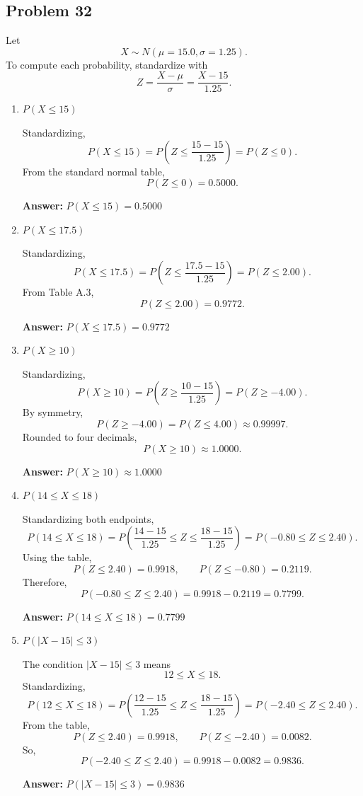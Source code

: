 \subsection*{Problem 32}

Let
\[
X \sim N(\mu=15.0,\sigma=1.25).
\]
To compute each probability, standardize with
\[
Z=\frac{X-\mu}{\sigma}=\frac{X-15}{1.25}.
\]

\begin{enumerate}
    \item[(a)] \textbf{$P(X\le 15)$}

    Standardizing,
    \[
    P(X\le 15)=P\left(Z\le \frac{15-15}{1.25}\right)=P(Z\le 0).
    \]
    From the standard normal table,
    \[
    P(Z\le 0)=0.5000.
    \]

    \textbf{Answer:} $P(X\le 15)=0.5000$

    \item[(b)] \textbf{$P(X\le 17.5)$}

    Standardizing,
    \[
    P(X\le 17.5)=P\left(Z\le \frac{17.5-15}{1.25}\right)=P(Z\le 2.00).
    \]
    From Table A.3,
    \[
    P(Z\le 2.00)=0.9772.
    \]

    \textbf{Answer:} $P(X\le 17.5)=0.9772$

    \item[(c)] \textbf{$P(X\ge 10)$}

    Standardizing,
    \[
    P(X\ge 10)=P\left(Z\ge \frac{10-15}{1.25}\right)=P(Z\ge -4.00).
    \]
    By symmetry,
    \[
    P(Z\ge -4.00)=P(Z\le 4.00)\approx 0.99997.
    \]
    Rounded to four decimals,
    \[
    P(X\ge 10)\approx 1.0000.
    \]

    \textbf{Answer:} $P(X\ge 10)\approx 1.0000$

    \item[(d)] \textbf{$P(14\le X\le 18)$}

    Standardizing both endpoints,
    \[
    P(14\le X\le 18)=P\left(\frac{14-15}{1.25}\le Z\le \frac{18-15}{1.25}\right)
    =P(-0.80\le Z\le 2.40).
    \]
    Using the table,
    \[
    P(Z\le 2.40)=0.9918,\qquad P(Z\le -0.80)=0.2119.
    \]
    Therefore,
    \[
    P(-0.80\le Z\le 2.40)=0.9918-0.2119=0.7799.
    \]

    \textbf{Answer:} $P(14\le X\le 18)=0.7799$

    \item[(e)] \textbf{$P(|X-15|\le 3)$}

    The condition $|X-15|\le 3$ means
    \[
    12\le X\le 18.
    \]
    Standardizing,
    \[
    P(12\le X\le 18)=P\left(\frac{12-15}{1.25}\le Z\le \frac{18-15}{1.25}\right)
    =P(-2.40\le Z\le 2.40).
    \]
    From the table,
    \[
    P(Z\le 2.40)=0.9918,\qquad P(Z\le -2.40)=0.0082.
    \]
    So,
    \[
    P(-2.40\le Z\le 2.40)=0.9918-0.0082=0.9836.
    \]

    \textbf{Answer:} $P(|X-15|\le 3)=0.9836$
\end{enumerate}

